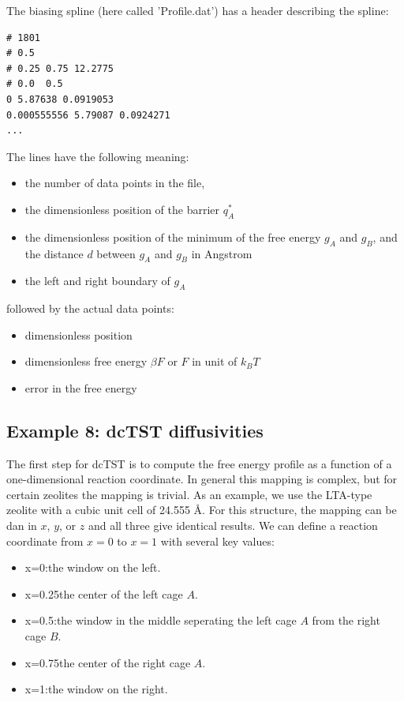 The biasing spline (here called 'Profile.dat') has a header describing the spline:
\begin{tiny}
\begin{verbatim}
# 1801
# 0.5
# 0.25 0.75 12.2775
# 0.0  0.5
0 5.87638 0.0919053
0.000555556 5.79087 0.0924271
...
\end{verbatim}
\end{tiny}
The lines have the following meaning:
\begin{itemize}
\item{the number of data points in the file},
\item{the dimensionless position of the barrier $q^*_A$}
\item{the dimensionless position of the minimum of the free energy $g_A$ and $g_B$, and the distance $d$ between $g_A$ and $g_B$ in Angstrom}
\item{the left and right boundary of $g_A$}
\end{itemize}
followed by the actual data points: 
\begin{itemize}
\item{dimensionless position}
\item{dimensionless free energy $\beta F$ or $F$ in unit of $k_BT$}
\item{error in the free energy}
\end{itemize}


\subsection*{Example 8: dcTST diffusivities}

The first step for dcTST is to compute the free energy profile as a function of a one-dimensional reaction coordinate.
In general this mapping is complex, but for certain zeolites the mapping is trivial.
As an example, we use the LTA-type zeolite with a cubic unit cell of 24.555 \AA.
For this structure, the mapping can be dan in $x$, $y$, or $z$ and all three give identical results.
We can define a reaction coordinate from $x=0$ to $x=1$ with several key values:
\begin{itemize}
 \item{x=0}:\quad the window on the left.
 \item{x=0.25}\quad the center of the left cage $A$.
 \item{x=0.5}:\quad the window in the middle seperating the left cage $A$ from the right cage $B$.
 \item{x=0.75}\quad the center of the right cage $A$.
 \item{x=1}:\quad the window on the right.
\end{itemize}


